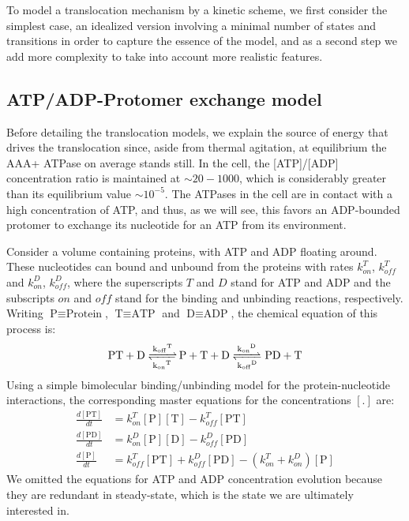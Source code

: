 To model a translocation mechanism by a kinetic scheme, we first consider the simplest case, an idealized version involving a minimal number of states and transitions in order to capture the essence of the model, and as a second step we add more complexity to take into account more realistic features.

\subsection{ATP/ADP-Protomer exchange model}
\label{subsec:atp-adp-exchange-model}
    Before detailing the translocation models, we explain the source of energy that drives the translocation since, aside from thermal agitation, at equilibrium the AAA+ ATPase on average stands still. In the cell, the [ATP]/[ADP] concentration ratio is maintained at $\sim20-1000$, which is considerably greater than its equilibrium value $\sim10^{-5}$\cite{meyrat_atp_2019}. The ATPases in the cell are in contact with a high concentration of ATP, and thus, as we will see, this favors an ADP-bounded protomer to exchange its nucleotide for an ATP from its environment.

    Consider a volume containing proteins, with ATP and ADP floating around. These nucleotides can bound and unbound from the proteins with rates $k_{on}^T$, $k_{off}^T$ and $k_{on}^D$, $k_{off}^D$, where the superscripts $T$ and $D$ stand for ATP and ADP and the subscripts $on$ and $off$ stand for the binding and unbinding reactions, respectively. Writing $\text{P}\equiv\text{Protein}$, $\text{T}\equiv\text{ATP}$ and $\text{D}\equiv\text{ADP}$, the chemical equation of this process is:
    \begin{equation}
        \ce{PT + D <=>[k_{off}^T][k_{on}^T] P + T + D <=>[k_{on}^D][k_{off}^D] PD + T}
    \end{equation}
    Using a simple bimolecular binding/unbinding model for the protein-nucleotide interactions, the corresponding master equations for the concentrations $[.]$ are:
    \begin{equation}
    \begin{split}
        \frac{d[\text{PT}]}{dt} &= k_{on}^T [\text{P}][\text{T}] - k_{off}^T [\text{PT}] \\
        \frac{d[\text{PD}]}{dt} &= k_{on}^D [\text{P}][\text{D}] - k_{off}^D [\text{PD}] \\
        \frac{d[\text{P}]}{dt} &= k_{off}^T [\text{PT}] + k_{off}^D [\text{PD}] - (k_{on}^T + k_{on}^D) [\text{P}]
    \end{split}
    \end{equation}
    We omitted the equations for ATP and ADP concentration evolution because they are redundant in steady-state, which is the state we are ultimately interested in. 
    
